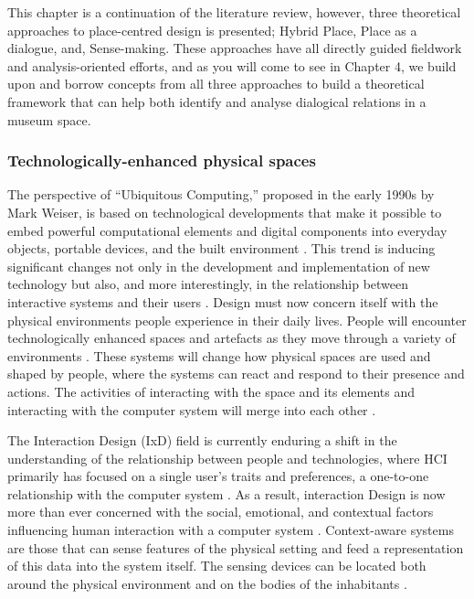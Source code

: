 This chapter is a continuation of the literature review, however, three theoretical approaches to place-centred design is presented; Hybrid Place, Place as a dialogue, and, Sense-making. These approaches have all directly guided fieldwork and analysis-oriented efforts, and as you will come to see in Chapter 4, we build upon and borrow concepts from all three approaches to build a theoretical framework that can help both identify and analyse dialogical relations in a museum space.

\subsubsection{Technologically-enhanced physical spaces}
The perspective of “Ubiquitous Computing,” proposed in the early 1990s by Mark Weiser, is based on technological developments that make it possible to embed powerful computational elements and digital components into everyday objects, portable devices, and the built environment \autocite[p. 217]{ciolfi_space_2005}. This trend is inducing significant changes not only in the development and implementation of new technology but also, and more interestingly, in the relationship between interactive systems and their users \autocite[p. 217]{ciolfi_space_2005}. Design must now concern itself with the physical environments people experience in their daily lives. People will encounter technologically enhanced spaces and artefacts as they move through a variety of environments \autocite[p. 217]{ciolfi_space_2005}. These systems will change how physical spaces are used and shaped by people, where the systems can react and respond to their presence and actions. The activities of interacting with the space and its elements and interacting with the computer system will merge into each other \autocite[p. 217]{ciolfi_space_2005}.

The Interaction Design (IxD) field is currently enduring a shift in the understanding of the relationship between people and technologies, where HCI primarily has focused on a single user's traits and preferences, a one-to-one relationship with the computer system \autocite[p. 217]{ciolfi_space_2005}. As a result, interaction Design is now more than ever concerned with the social, emotional, and contextual factors influencing human interaction with a computer system \autocite[p. 217]{ciolfi_space_2005}. Context-aware systems are those that can sense features of the physical setting and feed a representation of this data into the system itself. The sensing devices can be located both around the physical environment and on the bodies of the inhabitants \autocite[p. 218]{ciolfi_space_2005}.

